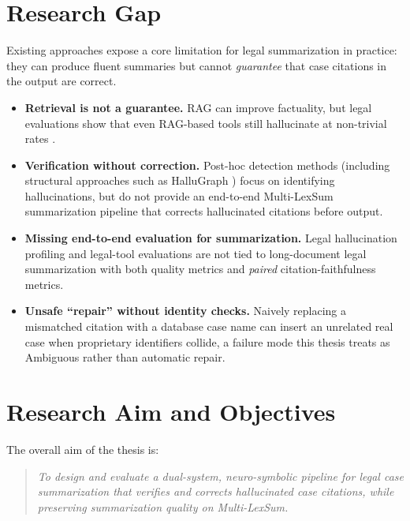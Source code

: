 \label{ch:research-gap}
\section{Research Gap}

Existing approaches expose a core limitation for legal summarization in practice: they can produce fluent summaries but cannot \emph{guarantee} that case citations in the output are correct.
\begin{itemize}
  \item \textbf{Retrieval is not a guarantee.} RAG \cite{lewis2020rag} can improve factuality, but legal evaluations show that even RAG-based tools still hallucinate at non-trivial rates \cite{magesh2025hallucinationfree}.
  \item \textbf{Verification without correction.} Post-hoc detection methods (including structural approaches such as HalluGraph \cite{noel2025hallugraph}) focus on identifying hallucinations, but do not provide an end-to-end Multi-LexSum summarization pipeline that corrects hallucinated citations before output.
  \item \textbf{Missing end-to-end evaluation for summarization.} Legal hallucination profiling \cite{dahl2024largelegalfictions} and legal-tool evaluations \cite{magesh2025hallucinationfree} are not tied to long-document legal summarization with both quality metrics and \emph{paired} citation-faithfulness metrics.
  \item \textbf{Unsafe ``repair'' without identity checks.} Naively replacing a mismatched citation with a database case name can insert an unrelated real case when proprietary identifiers collide, a failure mode this thesis treats as Ambiguous rather than automatic repair.
\end{itemize}

\section{Research Aim and Objectives}

The overall aim of the thesis is:
\begin{quote}
  \emph{To design and evaluate a dual-system, neuro-symbolic pipeline for legal case summarization that verifies and corrects hallucinated case citations, while preserving summarization quality on Multi-LexSum.}
\end{quote}

